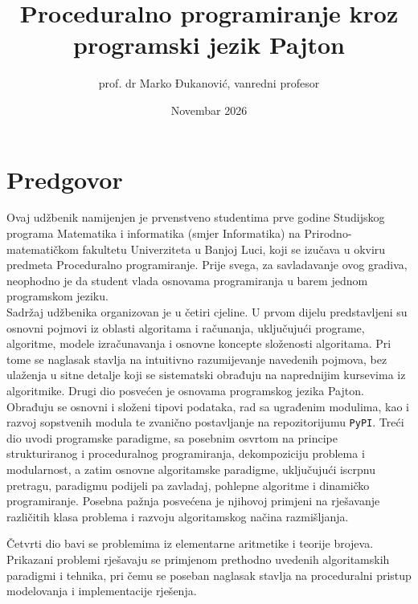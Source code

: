\documentclass[b5paper, utf8, 11pt, colorlinks]{book}
\begin{document}
\author{prof. dr Marko Đukanović, vanredni profesor}
\title{Proceduralno programiranje kroz programski jezik Pajton}
\date{Novembar 2026}

 
\maketitle
 
\tableofcontents
 \clearpage
 \setcounter{page}{1}

\chapter*{Predgovor}

Ovaj udžbenik namijenjen je prvenstveno studentima prve godine Studijskog programa Matematika i informatika (smjer Informatika) na Prirodno-matematičkom fakultetu Univerziteta u Banjoj Luci, koji se izučava u okviru predmeta Proceduralno programiranje. Prije svega, za savladavanje ovog gradiva,  neophodno je da student vlada  osnovama programiranja u barem jednom programskom jeziku.  \\ 


Sadržaj udžbenika organizovan je u četiri cjeline. U prvom dijelu predstavljeni su osnovni pojmovi iz oblasti algoritama i računanja, uključujući programe, algoritme, modele izračunavanja i osnovne koncepte složenosti algoritama. Pri tome se naglasak stavlja na intuitivno razumijevanje navedenih pojmova, bez ulaženja u sitne detalje koji se sistematski obrađuju na naprednijim kursevima iz algoritmike. Drugi dio posvećen je osnovama programskog jezika Pajton. Obrađuju se osnovni i složeni tipovi podataka, rad sa ugrađenim modulima, kao i razvoj sopstvenih modula te zvanično postavljanje na repozitorijumu \texttt{PyPI}.  Treći dio uvodi programske paradigme, sa posebnim osvrtom na principe strukturiranog i proceduralnog programiranja, dekompoziciju problema i modularnost, a zatim osnovne algoritamske paradigme, uključujući iscrpnu pretragu, paradigmu podijeli pa zavladaj, pohlepne algoritme i dinamičko programiranje. Posebna pažnja posvećena je njihovoj primjeni na rješavanje različitih klasa problema i razvoju algoritamskog načina razmišljanja.

Četvrti dio bavi se problemima iz elementarne aritmetike i teorije brojeva. Prikazani problemi rješavaju se primjenom prethodno uvedenih algoritamskih paradigmi i tehnika, pri čemu se poseban naglasak stavlja na proceduralni pristup modelovanja i implementacije rješenja.
\end{document}
